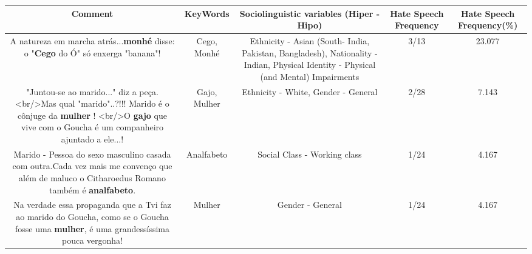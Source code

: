 \documentclass[11pt]{article}
\newlength\mylength
\begin{document}
\begin{center}
\setlength\mylength{\dimexpr\textwidth - 1\arrayrulewidth - 50\tabcolsep}
\begin{longtable}{|C{.65\mylength}|C{.30\mylength}|C{.12\mylength}|C{.12\mylength}|C{.12\mylength}|}
\hline
\textbf{Comment} & \textbf{KeyWords} & \textbf{Sociolinguistic variables (Hiper - Hipo)}  & \textbf{Hate Speech Frequency} & \textbf{Hate Speech Frequency(\%)} \\
\hline{}\small A natureza em marcha atrás...\textbf{m\textbf{onhé}} disse: o "\textbf{Cego} do Ó"  só enxerga "banana"!\normalsize   & Cego, Monhé & Ethnicity - Asian (South- India, Pakistan, Bangladesh), Nationality - Indian, Physical Identity - Physical (and Mental) Impairments & 3/13 & 23.077 \\  \hline
  \small "Juntou-se ao marido..." diz a peça.<br/>Mas qual "marido"..?!!!  Marido é o cônjuge da \textbf{mulher} ! <br/>O \textbf{gajo} que vive com o Goucha é um companheiro ajuntado a ele...!\normalsize   & Gajo, Mulher & Ethnicity - White, Gender - General & 2/28 & 7.143 \\  \hline
  \small Marido - Pessoa do sexo masculino casada com outra.Cada vez mais me convenço que além de maluco o Citharoedus Romano também é \textbf{analfabeto}.\normalsize   & Analfabeto & Social Class - Working class & 1/24 & 4.167 \\  \hline
  \small Na verdade essa propaganda que a Tvi faz ao marido do Goucha, como se o Goucha fosse uma \textbf{mulher}, é uma grandessíssima pouca vergonha!\normalsize   & Mulher & Gender - General & 1/24 & 4.167 \\  \hline
  
\end{longtable}
\end{center}
\end{document}
